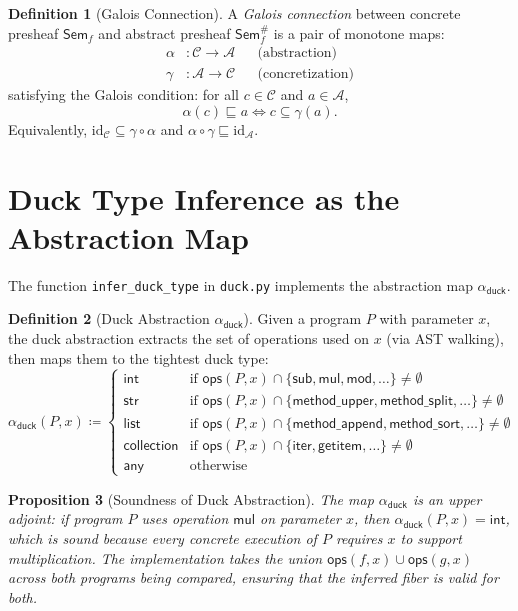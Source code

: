 \documentclass[11pt,a4paper]{report}
\theoremstyle{definition}
\newtheorem{definition}{Definition}[chapter]
\theoremstyle{plain}
\newtheorem{proposition}[definition]{Proposition}
\newcommand{\Sem}{\mathsf{Sem}}
\begin{document}
\begin{definition}[Galois Connection]
A \emph{Galois connection} between concrete presheaf $\Sem_f$ and
abstract presheaf $\Sem_f^\#$ is a pair of monotone maps:
\begin{align}
  \alpha &: \mathcal{C} \to \mathcal{A} && \text{(abstraction)} \\
  \gamma &: \mathcal{A} \to \mathcal{C} && \text{(concretization)}
\end{align}
satisfying the Galois condition: for all $c \in \mathcal{C}$ and
$a \in \mathcal{A}$,
\[
  \alpha(c) \sqsubseteq a \iff c \subseteq \gamma(a).
\]
Equivalently, $\mathrm{id}_\mathcal{C} \subseteq \gamma \circ \alpha$
and $\alpha \circ \gamma \sqsubseteq \mathrm{id}_\mathcal{A}$.
\end{definition}

\section{Duck Type Inference as the Abstraction Map}

The function \texttt{infer\_duck\_type} in \texttt{duck.py} implements
the abstraction map $\alpha_\mathsf{duck}$.

\begin{definition}[Duck Abstraction $\alpha_\mathsf{duck}$]
\label{def:duck-abstraction}
Given a program $P$ with parameter $x$, the duck abstraction extracts
the set of operations used on $x$ (via AST walking), then maps them to
the tightest duck type:
\[
  \alpha_\mathsf{duck}(P, x) \coloneqq \begin{cases}
    \mathsf{int} & \text{if } \mathsf{ops}(P, x) \cap
      \{\mathsf{sub}, \mathsf{mul}, \mathsf{mod}, \ldots\} \neq \emptyset \\
    \mathsf{str} & \text{if } \mathsf{ops}(P, x) \cap
      \{\mathsf{method\_upper}, \mathsf{method\_split}, \ldots\}
      \neq \emptyset \\
    \mathsf{list} & \text{if } \mathsf{ops}(P, x) \cap
      \{\mathsf{method\_append}, \mathsf{method\_sort}, \ldots\}
      \neq \emptyset \\
    \mathsf{collection} & \text{if } \mathsf{ops}(P, x) \cap
      \{\mathsf{iter}, \mathsf{getitem}, \ldots\} \neq \emptyset \\
    \mathsf{any} & \text{otherwise}
  \end{cases}
\]
\end{definition}

\begin{proposition}[Soundness of Duck Abstraction]
The map $\alpha_\mathsf{duck}$ is an upper adjoint: if program $P$
uses operation $\mathsf{mul}$ on parameter $x$, then
$\alpha_\mathsf{duck}(P, x) = \mathsf{int}$, which is sound because
every concrete execution of $P$ requires $x$ to support multiplication.
The implementation takes the union $\mathsf{ops}(f, x) \cup
\mathsf{ops}(g, x)$ across both programs being compared, ensuring
that the inferred fiber is valid for both.
\end{proposition}
\end{document}
